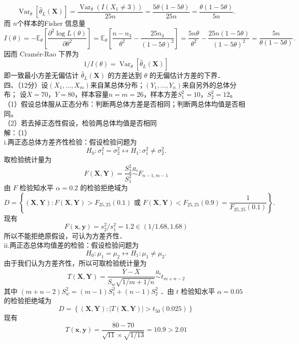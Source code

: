 \documentclass[UTF8]{ctexart}
\begin{document}
$$
\operatorname{Var}_\theta\left[\hat{\theta}_L(\boldsymbol{X})\right]=\frac{\operatorname{Var}_\theta\left(I\left(X_1 \neq 3\right)\right)}{25 n}=\frac{5 \theta(1-5 \theta)}{25 n}=\frac{\theta(1-5 \theta)}{5 n} .
$$
而 $n$个样本的Fisher 信息量
$$
I(\theta)=-\mathbb{E}_\theta\left[\frac{\partial^2 \log L(\theta)}{\partial \theta^2}\right]=\mathbb{E}_\theta\left[\frac{n-n_3}{\theta^2}-\frac{25 n_3}{(1-5 \theta)^2}\right]=\frac{5 n \theta}{\theta^2}-\frac{25 n(1-5 \theta)}{(1-5 \theta)^2}=\frac{5 n}{\theta(1-5 \theta)} .
$$
因而 Cramér-Rao 下界为 
$$1 / I(\theta)=\operatorname{Var}_\theta\left[\hat{\theta}_L(\boldsymbol{X})\right]$$
即一致最小方差无偏估计 $\hat{\theta}_L(\boldsymbol{X})$ 的方差达到 $\theta$ 的无偏估计方差的下界．\\



\noindent 四、（12分）设$\left( X_1,...,X_m\right)$来自某总体分布；$\left( Y_1,...,Y_n\right)$来自另外的总体分布；
设$\overline{X} = 70$，$\overline{Y} = 80$，样本容量$n = m = 26$，样本方差$S_1^2 = 10$，$S_2^2 = 12$。\\
（1）假设总体服从正态分布：判断两总体方差是否相同；判断两总体均值是否相同。\\
（2）若去掉正态性假设，检验两总体均值是否相同\\
解：（1）\\
i.两正态总体方差齐性检验：假设检验问题为
$$
H_0: \sigma_1^2=\sigma_2^2 \longleftrightarrow H_1: \sigma_1^2 \neq \sigma_2^2 .
$$
取检验统计量为
$$
F(\boldsymbol{X}, \boldsymbol{Y})=\frac{S_2^2}{S_1^2} \stackrel{H_0}{\sim} F_{n-1, m-1}
$$
由 $F$ 检验知水平 $\alpha=0.2$ 的检验拒绝域为
$$
D=\left\{(\boldsymbol{X}, \boldsymbol{Y}): F(\boldsymbol{X}, \boldsymbol{Y})>F_{25,25}(0.1) \text { 或 } F(\boldsymbol{X}, \boldsymbol{Y})<F_{25,25}(0.9)=\frac{1}{F_{25,25}(0.1)}\right\} \text {. }
$$
现有 
$$F(\boldsymbol{x}, \boldsymbol{y})=s_2^2 / s_1^2=1.2 \in(1 / 1.68,1.68)$$
所以不能拒绝原假设，可认为方差齐性．\\
ii.两正态总体均值差的检验：假设检验问题为
$$
H_0: \mu_1=\mu_2 \longleftrightarrow H_1: \mu_1 \neq \mu_2 .
$$
由于我们认为方差齐性，所以可取检验统计量为
$$
T(\boldsymbol{X}, \boldsymbol{Y})=\frac{\overline{Y}-\overline{X}}{S_w \sqrt{1 / m+1 / n}} \stackrel{H_0}{\sim} t_{m+n-2}
$$
其中 $(m+n-2) S_w^2=(m-1) S_1^2+(n-1) S_2^2$ ．由 $t$ 检验知水平 $\alpha=0.05$ 的检验拒绝域为
$$
D=\left\{(\boldsymbol{X}, \boldsymbol{Y}):|T(\boldsymbol{X}, \boldsymbol{Y})|>t_{50}(0.025)\right\}
$$
现有 
$$T(\boldsymbol{x}, \boldsymbol{y})=\frac{80-70}{\sqrt{11} \times \sqrt{1 / 13}}=10.9>2.01$$
\end{document}
